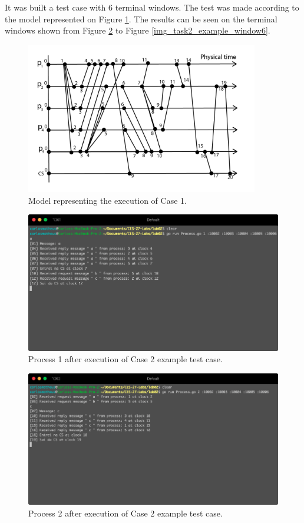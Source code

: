 \documentclass[a4paper, 11pt]{article}
\begin{document}
It was built a test case with 6 terminal windows. The test was made according to the model represented on Figure \ref{img_task2}. The results can be seen on the terminal windows shown from Figure \ref{img_task2_example_window1} to Figure \ref{img_task2_example_window6}.

\begin{figure}[h]
  \begin{center}
  \includegraphics[width=4in]{./imgs/case2.png}
  \caption{Model representing the execution of Case 1.}
  \label{img_task2}
  \end{center}
\end{figure}

\begin{figure}[h]
  \begin{center}
  \includegraphics[width=4.5in]{./imgs/case2process1.png}
  \caption{Process 1 after execution of Case 2 example test case.}
  \label{img_task2_example_window1}
  \end{center}
\end{figure}

\begin{figure}[h]
  \begin{center}
  \includegraphics[width=4.5in]{./imgs/case2process2.png}
  \caption{Process 2 after execution of Case 2 example test case.}
  \label{img_task2_example_window2}
  \end{center}
\end{figure}
\end{document}
